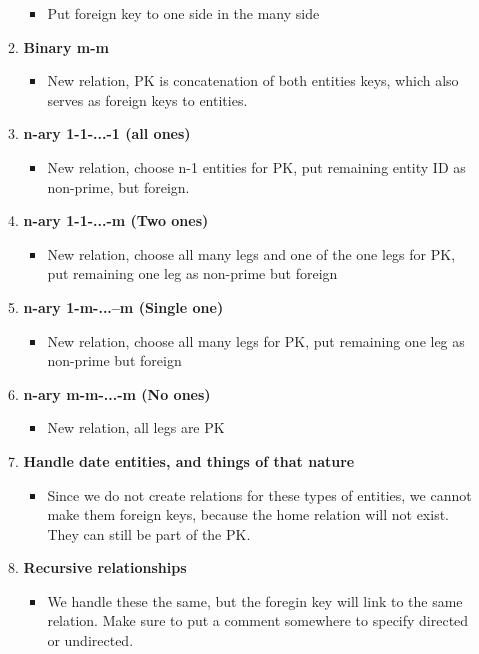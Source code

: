 \documentclass{report}
\begin{document}
\begin{itemize}
\begin{enumerate}
\begin{itemize}
                        \item Put foreign key to one side in the many side                     
                    \end{itemize}
                \item \textbf{Binary m-m}
                    \begin{itemize}
                        \item New relation, PK is concatenation of both entities keys, which also serves as foreign keys to entities. 
                    \end{itemize}
                \item \textbf{n-ary 1-1-...-1 (all ones)}
                    \begin{itemize}
                        \item New relation, choose n-1 entities for PK, put remaining entity ID as non-prime, but foreign.
                    \end{itemize}
                \item \textbf{n-ary 1-1-...-m (Two ones)}
                    \begin{itemize}
                        \item New relation, choose all many legs and one of the one legs for PK, put remaining one leg as non-prime but foreign
                    \end{itemize}
                \item \textbf{n-ary 1-m-...--m (Single one)}
                    \begin{itemize}
                        \item New relation, choose all many legs for PK, put remaining one leg as non-prime but foreign 
                    \end{itemize}
                \item \textbf{n-ary m-m-...-m (No ones)}
                    \begin{itemize}
                        \item New relation, all legs are PK
                    \end{itemize}
                \item \textbf{Handle date entities, and things of that nature}
                    \begin{itemize}
                        \item Since we do not create relations for these types of entities, we cannot make them foreign keys, because the home relation will not exist. They can still be part of the PK.
                    \end{itemize}
                \item \textbf{Recursive relationships}
                    \begin{itemize}
                        \item We handle these the same, but the foregin key will link to the same relation. Make sure to put a comment somewhere to specify directed or undirected.
                    \end{itemize}
            \end{enumerate}


\end{itemize}
\end{document}
